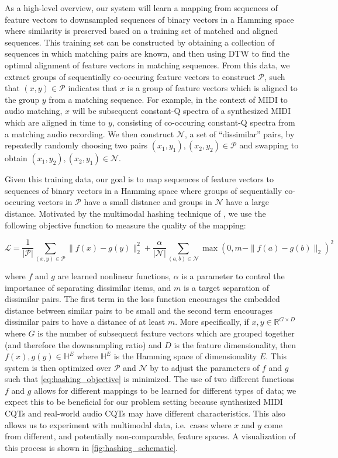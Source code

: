 As a high-level overview, our system will learn a mapping from sequences of feature vectors to downsampled sequences of binary vectors in a Hamming space where similarity is preserved based on a training set of matched and aligned sequences.
This training set can be constructed by obtaining a collection of sequences in which matching pairs are known, and then using DTW to find the optimal alignment of feature vectors in matching sequences.
From this data, we extract groups of sequentially co-occuring feature vectors to construct $\mathcal{P}$, such that $(x, y) \in \mathcal{P}$ indicates that $x$ is a group of feature vectors which is aligned to the group $y$ from a matching sequence.
For example, in the context of MIDI to audio matching, $x$ will be subsequent constant-Q spectra of a synthesized MIDI which are aligned in time to $y$, consisting of co-occuring constant-Q spectra from a matching audio recording.
We then construct $\mathcal{N}$, a set of ``dissimilar'' pairs, by repeatedly randomly choosing two pairs $(x_1, y_1), (x_2, y_2) \in \mathcal{P}$ and swapping to obtain $(x_1, y_2), (x_2, y_1) \in \mathcal{N}$.

Given this training data, our goal is to map sequences of feature vectors to sequences of binary vectors in a Hamming space where groups of sequentially co-occuring vectors in $\mathcal{P}$ have a small distance and groups in $\mathcal{N}$ have a large distance.
Motivated by the multimodal hashing technique of \cite{masci2014multimodal}, we use the following objective function to measure the quality of the mapping:

\begin{equation}
\mathcal{L} = \frac{1}{|\mathcal{P}|} \sum_{(x, y) \in \mathcal{P}} \| f(x) - g(y) \|_2^2  + \frac{\alpha}{|\mathcal{N}|} \sum_{(a, b) \in \mathcal{N}} \max(0, m - \|f(a) - g(b) \|_2)^2
\label{eq:hashing_objective}
\end{equation}

where $f$ and $g$ are learned nonlinear functions, $\alpha$ is a parameter to control the importance of separating dissimilar items, and $m$ is a target separation of dissimilar pairs.
The first term in the loss function encourages the embedded distance between similar pairs to be small and the second term encourages dissimilar pairs to have a distance of at least $m$.
More specifically, if $x, y \in \mathbb{R}^{G \times D}$ where $G$ is the number of subsequent feature vectors which are grouped together (and therefore the downsampling ratio) and $D$ is the feature dimensionality, then $f(x), g(y) \in \mathbb{H}^E$ where $\mathbb{H}^E$ is the Hamming space of dimensionality $E$.
This system is then optimized over $\mathcal{P}$ and $\mathcal{N}$ by to adjust the parameters of $f$ and $g$ such that \cref{eq:hashing_objective} is minimized.
The use of two different functions $f$ and $g$ allows for different mappings to be learned for different types of data; we expect this to be beneficial for our problem setting because synthesized MIDI CQTs and real-world audio CQTs may have different characteristics.
This also allows us to experiment with multimodal data, i.e.\ cases where $x$ and $y$ come from different, and potentially non-comparable, feature spaces.
A visualization of this process is shown in \cref{fig:hashing_schematic}.

